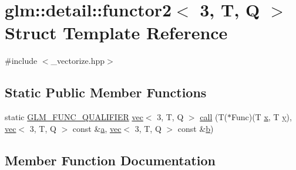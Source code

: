 \hypertarget{structglm_1_1detail_1_1functor2_3_013_00_01_t_00_01_q_01_4}{}\section{glm\+:\+:detail\+:\+:functor2$<$ 3, T, Q $>$ Struct Template Reference}
\label{structglm_1_1detail_1_1functor2_3_013_00_01_t_00_01_q_01_4}


{\ttfamily \#include $<$\+\_\+vectorize.\+hpp$>$}

\subsection*{Static Public Member Functions}
\begin{DoxyCompactItemize}
\item 
static \mbox{\hyperlink{setup_8hpp_a33fdea6f91c5f834105f7415e2a64407}{G\+L\+M\+\_\+\+F\+U\+N\+C\+\_\+\+Q\+U\+A\+L\+I\+F\+I\+ER}} \mbox{\hyperlink{structglm_1_1vec}{vec}}$<$ 3, T, Q $>$ \mbox{\hyperlink{structglm_1_1detail_1_1functor2_3_013_00_01_t_00_01_q_01_4_ad26040a8693201baea2ceb8561d14209}{call}} (T($\ast$Func)(T \mbox{\hyperlink{_s_d_l__opengl_8h_ad0e63d0edcdbd3d79554076bf309fd47}{x}}, T \mbox{\hyperlink{_s_d_l__opengl_8h_a1675d9d7bb68e1657ff028643b4037e3}{y}}), \mbox{\hyperlink{structglm_1_1vec}{vec}}$<$ 3, T, Q $>$ const \&\mbox{\hyperlink{_s_d_l__opengl__glext_8h_a3309789fc188587d666cda5ece79cf82}{a}}, \mbox{\hyperlink{structglm_1_1vec}{vec}}$<$ 3, T, Q $>$ const \&\mbox{\hyperlink{_s_d_l__opengl__glext_8h_a0f71581a41fd2264c8944126dabbd010}{b}})
\end{DoxyCompactItemize}


\subsection{Member Function Documentation}
\mbox{\label{structglm_1_1detail_1_1functor2_3_013_00_01_t_00_01_q_01_4_ad26040a8693201baea2ceb8561d14209}} 
